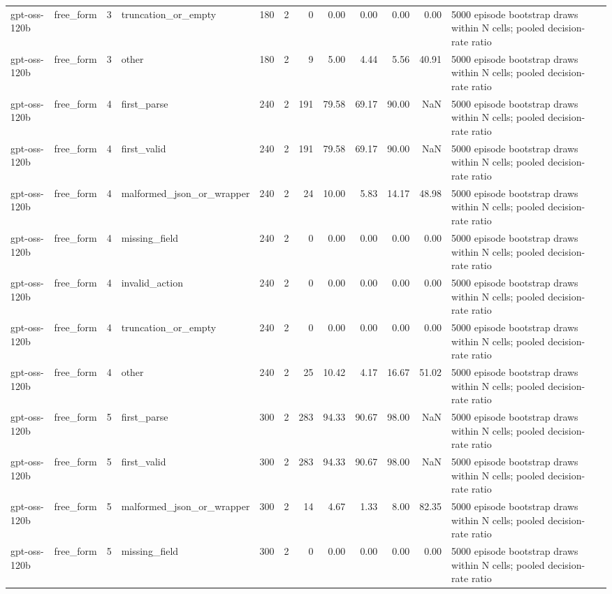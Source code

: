 \begin{tabular}{llllrrrrrrrl}
gpt-oss-120b & free\_form & 3 & truncation\_or\_empty & 180 & 2 & 0 & 0.00 & 0.00 & 0.00 & 0.00 & 5000 episode bootstrap draws within N cells; pooled decision-rate ratio \\
gpt-oss-120b & free\_form & 3 & other & 180 & 2 & 9 & 5.00 & 4.44 & 5.56 & 40.91 & 5000 episode bootstrap draws within N cells; pooled decision-rate ratio \\
gpt-oss-120b & free\_form & 4 & first\_parse & 240 & 2 & 191 & 79.58 & 69.17 & 90.00 & NaN & 5000 episode bootstrap draws within N cells; pooled decision-rate ratio \\
gpt-oss-120b & free\_form & 4 & first\_valid & 240 & 2 & 191 & 79.58 & 69.17 & 90.00 & NaN & 5000 episode bootstrap draws within N cells; pooled decision-rate ratio \\
gpt-oss-120b & free\_form & 4 & malformed\_json\_or\_wrapper & 240 & 2 & 24 & 10.00 & 5.83 & 14.17 & 48.98 & 5000 episode bootstrap draws within N cells; pooled decision-rate ratio \\
gpt-oss-120b & free\_form & 4 & missing\_field & 240 & 2 & 0 & 0.00 & 0.00 & 0.00 & 0.00 & 5000 episode bootstrap draws within N cells; pooled decision-rate ratio \\
gpt-oss-120b & free\_form & 4 & invalid\_action & 240 & 2 & 0 & 0.00 & 0.00 & 0.00 & 0.00 & 5000 episode bootstrap draws within N cells; pooled decision-rate ratio \\
gpt-oss-120b & free\_form & 4 & truncation\_or\_empty & 240 & 2 & 0 & 0.00 & 0.00 & 0.00 & 0.00 & 5000 episode bootstrap draws within N cells; pooled decision-rate ratio \\
gpt-oss-120b & free\_form & 4 & other & 240 & 2 & 25 & 10.42 & 4.17 & 16.67 & 51.02 & 5000 episode bootstrap draws within N cells; pooled decision-rate ratio \\
gpt-oss-120b & free\_form & 5 & first\_parse & 300 & 2 & 283 & 94.33 & 90.67 & 98.00 & NaN & 5000 episode bootstrap draws within N cells; pooled decision-rate ratio \\
gpt-oss-120b & free\_form & 5 & first\_valid & 300 & 2 & 283 & 94.33 & 90.67 & 98.00 & NaN & 5000 episode bootstrap draws within N cells; pooled decision-rate ratio \\
gpt-oss-120b & free\_form & 5 & malformed\_json\_or\_wrapper & 300 & 2 & 14 & 4.67 & 1.33 & 8.00 & 82.35 & 5000 episode bootstrap draws within N cells; pooled decision-rate ratio \\
gpt-oss-120b & free\_form & 5 & missing\_field & 300 & 2 & 0 & 0.00 & 0.00 & 0.00 & 0.00 & 5000 episode bootstrap draws within N cells; pooled decision-rate ratio \\

\end{tabular}
